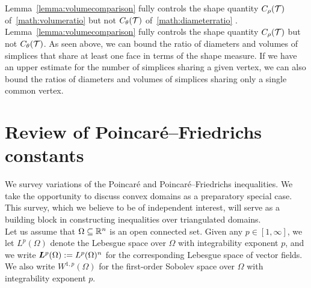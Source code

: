 \documentclass[10pt,letterpaper]{article}
\newcommand\cye[1]{%
\protect\leavevmode
\begingroup
    \color{red!35!yellow}%
    #1%
\endgroup
}
\begin{document}
\begin{remark}
    Lemma~\ref{lemma:volumecomparison} fully controls the shape quantity $C_\rho({\mathcal T})$ \cye{of~\eqref{math:volumeratio}} but not $C_\theta({\mathcal T})$ \cye{of~\eqref{math:diameterratio}}. 
    Lemma~\ref{lemma:volumecomparison} fully controls the shape quantity $C_\rho({\mathcal T})$ but not $C_\theta({\mathcal T})$. 
    As seen above, we can bound the ratio of diameters and volumes of simplices that share at least one face in terms of the shape measure. 
    If we have an upper estimate for the number of simplices sharing a given vertex, 
    we can also bound the ratios of diameters and volumes of simplices sharing only a single common vertex. 
\end{remark}










































\section{Review of Poincar\'e--Friedrichs constants}\label{section:poincare}

We survey variations of the Poincar\'e and Poincar\'e--Friedrichs inequalities. 
We take the opportunity to discuss convex domains as a preparatory special case.
This survey, which we believe to be of independent interest, will serve as a building block in constructing inequalities over triangulated domains.
\\

Let us assume that $\Omega \subseteq {\mathbb R}^{n}$ is an open connected set. 
Given any $p \in [1,\infty]$, we let $L^{p}(\Omega)$ denote the Lebesgue space over $\Omega$ with integrability exponent $p$, and we write $\bm{L}^{p}(\Omega) := L^{p}(\Omega)^{n}$ for the corresponding Lebesgue space of vector fields. 
We also write $W^{1,p}(\Omega)$ for the first-order Sobolev space over $\Omega$ with integrability exponent $p$. 
\end{document}
